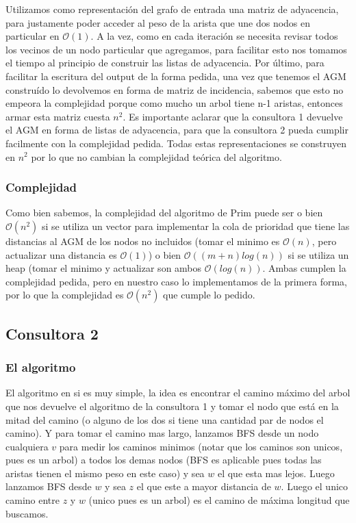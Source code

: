 \documentclass[A4paper,oneside,fleqn,11pt]{article}
\theoremstyle{definition}
\begin{document}
Utilizamos como representación del grafo de entrada una matriz de adyacencia, para justamente poder acceder al peso de la arista que une dos nodos en particular en $\mathcal{O} (1)$. A la vez, como en cada iteración se necesita revisar todos los vecinos de un nodo particular que agregamos, para facilitar esto nos tomamos el tiempo al principio de construir las listas de adyacencia. Por último, para facilitar la escritura del output de la forma pedida, una vez que tenemos el AGM construído lo devolvemos en forma de matriz de incidencia, sabemos que esto no empeora la complejidad porque como mucho un arbol tiene n-1 aristas, entonces armar esta matriz cuesta $n^2$. Es importante aclarar que la consultora 1 devuelve el AGM en forma de listas de adyacencia, para que la consultora 2 pueda cumplir facilmente con la complejidad pedida. Todas estas representaciones se construyen en $n^2$ por lo que no cambian la complejidad teórica del algoritmo.


\subsubsection{Complejidad}

Como bien sabemos, la complejidad del algoritmo de Prim puede ser o bien $\mathcal{O} (n^2)$ si se utiliza un vector para implementar la cola de prioridad que tiene las distancias al AGM de los nodos no incluidos (tomar el minimo es $\mathcal{O} (n)$, pero actualizar una distancia es $\mathcal{O} (1)$) o bien $\mathcal{O} ((m+n) log(n))$ si se utiliza un heap (tomar el minimo y actualizar son ambos $\mathcal{O} (log(n))$. Ambas cumplen la complejidad pedida, pero en nuestro caso lo implementamos de la primera forma, por lo que la complejidad es $\mathcal{O} (n^2)$ que cumple lo pedido.

\subsection{Consultora 2}


\subsubsection{El algoritmo}
El algoritmo en si es muy simple, la idea es encontrar el camino máximo del arbol que nos devuelve el algoritmo de la consultora 1 y tomar el nodo que está en la mitad del camino (o alguno de los dos si tiene una cantidad par de nodos el camino). Y para tomar el camino mas largo, lanzamos BFS desde un nodo cualquiera $v$ para medir los caminos minimos (notar que los caminos son unicos, pues es un arbol) a todos los demas nodos (BFS es aplicable pues todas las aristas tienen el mismo peso en este caso) y sea $w$ el que esta mas lejos. Luego lanzamos BFS desde $w$ y sea $z$ el que este a mayor distancia de $w$. Luego el unico camino entre $z$ y $w$ (unico pues es un arbol) es el camino de máxima longitud que buscamos.
\end{document}
